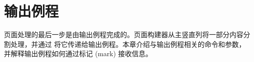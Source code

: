 \documentclass{book}
\begin{document}
\chapter{输出例程}\label{output}

页面处理的最后一步是由输出例程完成的。页面构建器从主竖直列将一部分内容分割处理，并通过  将它传递给输出例程。本章介绍与输出例程相关的命令和参数，并解释输出例程如何通过标记 (mark) 接收信息。
\end{document}
